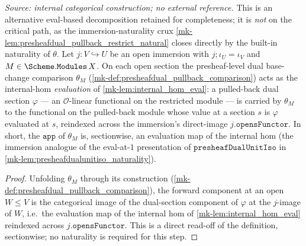 \begin{lemma}\label{mk-lem:presheafdual_pullback_comparison_eval_apply}
  \leanok

  \textit{Source: internal categorical construction; no external reference.}
  This is an alternative eval-based decomposition retained for completeness; it is \emph{not} on the
  critical path, as the immersion-naturality crux \ref{mk-lem:presheafdual_pullback_restrict_natural}
  closes directly by the built-in naturality of \(\theta\).
  Let \(j : V \hookrightarrow U\) be an open immersion with \(j \mathbin{;} \iota_U = \iota_V\) and
  \(M \in \Scheme.\mathtt{Modules}\,X\). On each open section the presheaf-level dual base-change
  comparison \(\theta_M\) (\ref{mk-def:presheafdual_pullback_comparison})
  acts as the internal-hom \emph{evaluation} of \ref{mk-lem:internal_hom_eval}: a pulled-back dual
  section \(\varphi\) --- an \(\mathcal{O}\)-linear functional on the restricted module --- is carried
  by \(\theta_M\) to the functional on the pulled-back module whose value at a section \(s\) is
  \(\varphi\) evaluated at \(s\), reindexed across the immersion's direct-image
  \(j.\mathtt{opensFunctor}\). In short, the \(\mathtt{app}\) of \(\theta_M\) is, sectionwise, an
  evaluation map of the internal hom (the immersion analogue of the eval-at-\(1\) presentation of
  \(\mathtt{presheafDualUnitIso}\) in \ref{mk-lem:presheafdualunitiso_naturality}).
\end{lemma}
\begin{proof}
  \leanok
  Unfolding \(\theta_M\) through its construction (\ref{mk-def:presheafdual_pullback_comparison}), the forward
  component at an open \(W \le V\) is the categorical image of the dual-section component of
  \(\varphi\) at the \(j\)-image of \(W\), i.e.\ the evaluation map of the internal hom of
  \ref{mk-lem:internal_hom_eval} reindexed across \(j.\mathtt{opensFunctor}\). This is a direct
  read-off of the definition, sectionwise; no naturality is required for this step.
\end{proof}

